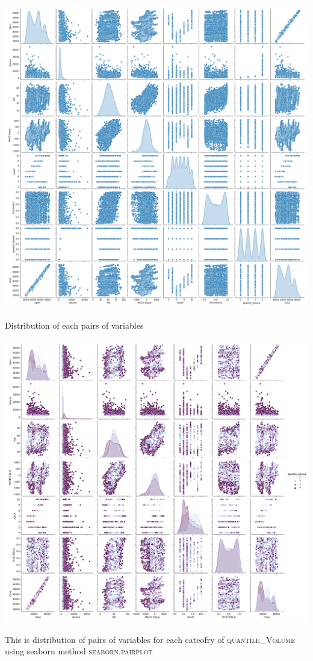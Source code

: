 \documentclass[%
12pt, %
final, %
oneside, %
onecolumn, %
centertags]{article} %
\theoremstyle{plain}
\theoremstyle{definition}
\theoremstyle{remark}
\begin{document}
\begin{center}
\includegraphics[scale=0.35]{images/distr.png}

Distribution of each pairs of variables
\end{center}

\begin{center}
\includegraphics[scale=0.4]{images/distr_hue_quantile_volume.png}

This is distribution of pairs of variables for each cateofry of \textsc{quantile\_Volume} using seaborn method \textsc{seaborn.pairplot}
\end{center}
\end{document}
